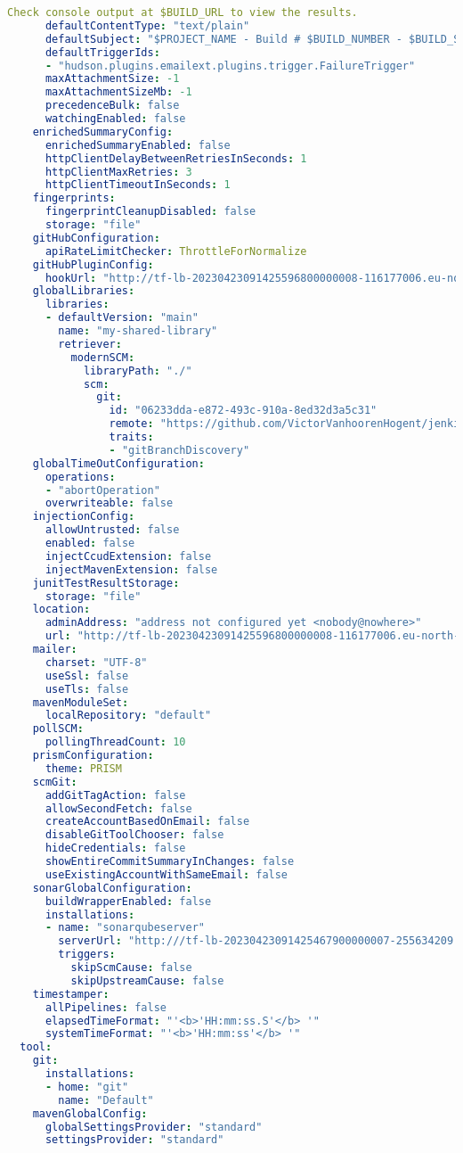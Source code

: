 \begin{lstlisting}[language=yaml, style=yamlstyle]
        Check console output at $BUILD_URL to view the results.
      defaultContentType: "text/plain"
      defaultSubject: "$PROJECT_NAME - Build # $BUILD_NUMBER - $BUILD_STATUS!"
      defaultTriggerIds:
      - "hudson.plugins.emailext.plugins.trigger.FailureTrigger"
      maxAttachmentSize: -1
      maxAttachmentSizeMb: -1
      precedenceBulk: false
      watchingEnabled: false
    enrichedSummaryConfig:
      enrichedSummaryEnabled: false
      httpClientDelayBetweenRetriesInSeconds: 1
      httpClientMaxRetries: 3
      httpClientTimeoutInSeconds: 1
    fingerprints:
      fingerprintCleanupDisabled: false
      storage: "file"
    gitHubConfiguration:
      apiRateLimitChecker: ThrottleForNormalize
    gitHubPluginConfig:
      hookUrl: "http://tf-lb-20230423091425596800000008-116177006.eu-north-1.elb.amazonaws.com/github-webhook/"
    globalLibraries:
      libraries:
      - defaultVersion: "main"
        name: "my-shared-library"
        retriever:
          modernSCM:
            libraryPath: "./"
            scm:
              git:
                id: "06233dda-e872-493c-910a-8ed32d3a5c31"
                remote: "https://github.com/VictorVanhoorenHogent/jenkins_shared_lib.git"
                traits:
                - "gitBranchDiscovery"
    globalTimeOutConfiguration:
      operations:
      - "abortOperation"
      overwriteable: false
    injectionConfig:
      allowUntrusted: false
      enabled: false
      injectCcudExtension: false
      injectMavenExtension: false
    junitTestResultStorage:
      storage: "file"
    location:
      adminAddress: "address not configured yet <nobody@nowhere>"
      url: "http://tf-lb-20230423091425596800000008-116177006.eu-north-1.elb.amazonaws.com/"
    mailer:
      charset: "UTF-8"
      useSsl: false
      useTls: false
    mavenModuleSet:
      localRepository: "default"
    pollSCM:
      pollingThreadCount: 10
    prismConfiguration:
      theme: PRISM
    scmGit:
      addGitTagAction: false
      allowSecondFetch: false
      createAccountBasedOnEmail: false
      disableGitToolChooser: false
      hideCredentials: false
      showEntireCommitSummaryInChanges: false
      useExistingAccountWithSameEmail: false
    sonarGlobalConfiguration:
      buildWrapperEnabled: false
      installations:
      - name: "sonarqubeserver"
        serverUrl: "http:///tf-lb-20230423091425467900000007-255634209.eu-north-1.elb.amazonaws.com/"
        triggers:
          skipScmCause: false
          skipUpstreamCause: false
    timestamper:
      allPipelines: false
      elapsedTimeFormat: "'<b>'HH:mm:ss.S'</b> '"
      systemTimeFormat: "'<b>'HH:mm:ss'</b> '"
  tool:
    git:
      installations:
      - home: "git"
        name: "Default"
    mavenGlobalConfig:
      globalSettingsProvider: "standard"
      settingsProvider: "standard"
\end{lstlisting}

